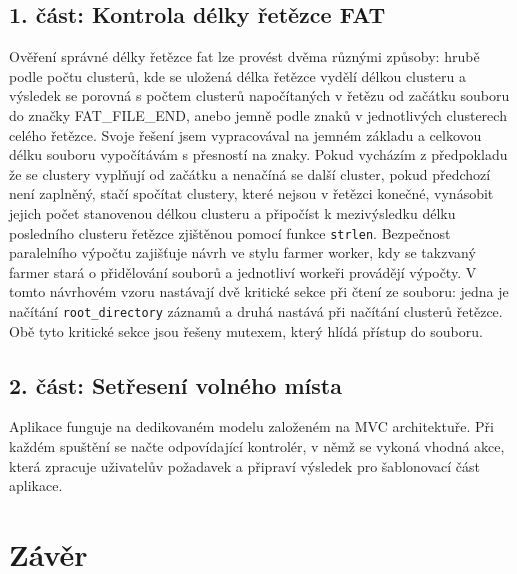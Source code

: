 \documentclass[12pt,a4paper]{article}
\let\oldsection\section
\renewcommand\section{\clearpage\oldsection}
\begin{document}
\subsection{1. část: Kontrola délky řetězce FAT}
Ověření správné délky řetězce fat lze provést dvěma různými způsoby: hrubě podle počtu clusterů, kde se uložená délka řetězce vydělí délkou clusteru a výsledek se porovná s počtem clusterů napočítaných v řetězu od začátku souboru do značky FAT\_FILE\_END, anebo jemně podle znaků v jednotlivých clusterech celého řetězce. Svoje řešení jsem vypracovával na jemném základu a celkovou délku souboru vypočítávám s přesností na znaky. Pokud vycházím z předpokladu že se clustery vyplňují od začátku a nenačíná se další cluster, pokud předchozí není zaplněný, stačí spočítat clustery, které nejsou v řetězci konečné, vynásobit jejich počet stanovenou délkou clusteru a připočíst k mezivýsledku délku posledního clusteru řetězce zjištěnou pomocí funkce \texttt{strlen}.
Bezpečnost paralelního výpočtu zajišťuje návrh ve stylu farmer worker, kdy se takzvaný farmer stará o přidělování souborů a jednotliví workeři provádějí výpočty. V tomto návrhovém vzoru nastávají dvě kritické sekce při čtení ze souboru: jedna je načítání \texttt{root\_directory} záznamů a druhá nastává při načítání clusterů řetězce. Obě tyto kritické sekce jsou řešeny mutexem, který hlídá přístup do souboru.
\subsection{2. část: Setřesení volného místa}
Aplikace funguje na dedikovaném modelu založeném na MVC architektuře. Při každém spuštění se načte odpovídající kontrolér, v němž se vykoná vhodná akce, která zpracuje uživatelův požadavek a připraví výsledek pro šablonovací část aplikace.

\section{Závěr}



\end{document}
